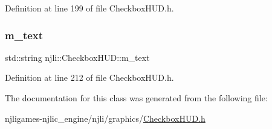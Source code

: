 Definition at line 199 of file Checkbox\+H\+U\+D.\+h.

\mbox{\label{classnjli_1_1_checkbox_h_u_d_a5746b7e4e3127374c6761d077e061661}} 
\subsubsection{\texorpdfstring{m\+\_\+text}{m\_text}}
{\footnotesize\ttfamily std\+::string njli\+::\+Checkbox\+H\+U\+D\+::m\+\_\+text\hspace{0.3cm}{\ttfamily [private]}}



Definition at line 212 of file Checkbox\+H\+U\+D.\+h.



The documentation for this class was generated from the following file\+:\begin{DoxyCompactItemize}
\item 
njligames-\/njlic\+\_\+engine/njli/graphics/\mbox{\hyperlink{_checkbox_h_u_d_8h}{Checkbox\+H\+U\+D.\+h}}\end{DoxyCompactItemize}
